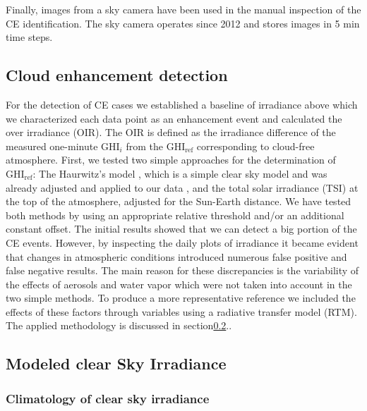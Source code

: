 \documentclass[preprint, 5p,
authoryear]{elsarticle} %
\begin{document}
Finally, images from a sky camera have been used in the manual
inspection of the CE identification. The sky camera operates since 2012
and stores images in 5 min time steps.

\hypertarget{cloud-enhancement-detection}{%
\subsection{Cloud enhancement
detection}\label{cloud-enhancement-detection}}

For the detection of CE cases we established a baseline of irradiance
above which we characterized each data point as an enhancement event and
calculated the over irradiance (OIR). The OIR is defined as the
irradiance difference of the measured one-minute \(\text{GHI}_i\) from
the \(\text{GHI}_\text{ref}\) corresponding to cloud-free atmosphere.
First, we tested two simple approaches for the determination of
\(\text{GHI}_\text{ref}\): The Haurwitz's model \citep{Haurwitz1945},
which is a simple clear sky model and was already adjusted and applied
to our data \citep{Natsis2023}, and the total solar irradiance (TSI) at
the top of the atmosphere, adjusted for the Sun-Earth distance. We have
tested both methods by using an appropriate relative threshold and/or an
additional constant offset. The initial results showed that we can
detect a big portion of the CE events. However, by inspecting the daily
plots of irradiance it became evident that changes in atmospheric
conditions introduced numerous false positive and false negative
results. The main reason for these discrepancies is the variability of
the effects of aerosols and water vapor which were not taken into
account in the two simple methods. To produce a more representative
reference we included the effects of these factors through variables
using a radiative transfer model (RTM). The applied methodology is
discussed in section\nobreakspace{}\ref{rtmcs}..

\hypertarget{rtmcs}{%
\subsection{Modeled clear Sky Irradiance}\label{rtmcs}}

\hypertarget{climatology-of-clear-sky-irradiance}{%
\subsubsection{Climatology of clear sky
irradiance}\label{climatology-of-clear-sky-irradiance}}
\end{document}
